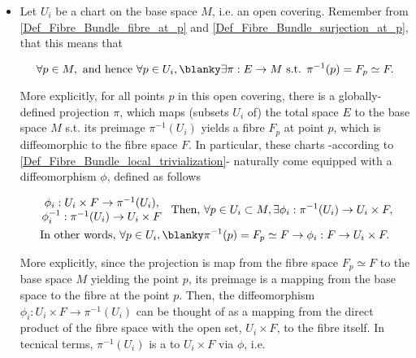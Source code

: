 \begin{remark}
\end{remark}
\begin{itemize}
        \item Let $U_i$ be a chart on the base space $M$, i.e. an open covering. Remember from \cref{Def_Fibre_Bundle_fibre_at_p} and \cref{Def_Fibre_Bundle_surjection_at_p}, that this means that 

        $$
            \forall p \in M, \textnormal{ and hence } \forall p \in U_i, \blanky \exists \pi: E \rightarrow M \textnormal{ s.t. } \pi^{-1}(p) = F_p \simeq F.
        $$

        More explicitly, for all points $p$ in this open covering, there is a globally-defined projection $\pi$, which maps (subsets $U_i$ of) the total space $E$ to the base space $M$ s.t. its preimage $\pi^{-1}(U_i)$ yields a fibre $F_p$ at point $p$, which is diffeomorphic to the fibre space $F$. 
        In particular, these charts -according to \cref{Def_Fibre_Bundle_local_trivialization}- naturally come   equipped with a diffeomorphism $\phi$, defined as follows
        
        \begin{equation*}
            \begin{split}
            &\begin{array}{cc}
                 \phi_i: U_i \times F \rightarrow \pi^{-1}(U_i), \\ 
                \phi_i^{-1}: \pi^{-1}(U_i) \rightarrow U_i \times F 
             \end{array} \textnormal{ Then, }\forall p \in U_i \subset M, \exists \phi_i: \pi^{-1}(U_i) \rightarrow U_i \times F, \\
            &\textnormal{ In other words, } \forall p \in U_i, \blanky \pi^{-1}(p) = F_p \simeq F \rightarrow  \phi_i: F \rightarrow U_i \times F.
            \end{split}
        \end{equation*}
         
        More explicitly, since the projection is map from the fibre space $F_p \simeq F$ to the base space $M$ yielding the point $p$, its preimage is a mapping from the base space to the fibre at the point $p$.
        Then, the diffeomorphism $\phi_i: U_i \times F \rightarrow \pi^{-1}(U_i)$ can be thought of as a mapping from the direct product of the fibre space with the open set, $U_i \times F$, to the fibre itself. In tecnical terms, $\pi^{-1}(U_i)$ is 
        a  to $U_i \times F$ via $\phi$, i.e.


\end{itemize}
